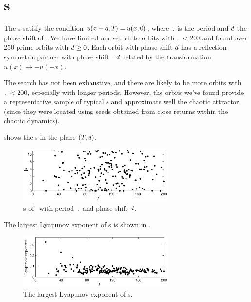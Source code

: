 %

\section{\Rpo s}

The \rpo s satisfy the condition $u(x+d,{T_{}}) = u(x,0)$, where $\period{}$
is the period and $d$ the phase shift of \rpo .  We have
limited our search to orbits with $\period{} < 200$ and found over 250 prime
orbits with $d \ge 0$.  Each orbit with phase shift $d$
has a reflection symmetric partner with phase shift $-d$
related by the transformation $u(x) \to -u(-x)$.

The search has not been exhaustive, and there are likely to be more
orbits with $\period{} < 200$, especially with longer periods.  However, the
orbits we've found provide a representative sample of typical \rpo s
and approximate well the chaotic attractor (since they were located
using seeds obtained from close returns within the chaotic
dynamics).

 shows the \rpo s in the plane $({T_{}},d)$.
\begin{figure}[t]
\begin{center}
\includegraphics[width=0.7\textwidth]{figs/ks22_rpos_Tdelta.eps}
\end{center}
\caption{\Rpo s of \KSe\ with period $\period{}$ and phase shift $d$.
        } \label{f:ks22rposT}
\end{figure}

The largest Lyapunov exponent of \rpo s is shown in
.

\begin{figure}[t]
\begin{center}
\includegraphics[width=0.7\textwidth]{figs/ks22_rpos_lyap.eps}
\end{center}
\caption{The largest Lyapunov exponent of \rpo s.
        } \label{f:ks22rposL}
\end{figure}

